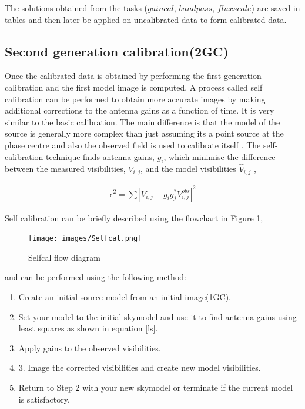 The solutions obtained from the tasks ($\textit{gaincal}$, $\textit{bandpass}$, $\textit{fluxscale}$) are saved in tables and then later be applied on uncalibrated data 
to form calibrated data.

\subsection{Second generation calibration(2GC)}

Once the calibrated data is obtained by performing the first generation calibration and the first model image is computed. A process called self calibration can be performed to obtain more accurate images by making additional corrections to the antenna gains as a function of time. It is very similar to the basic calibration. The main difference is that the model of the source is generally more complex than just assuming its a point source at the phase centre and also the observed field is used to calibrate itself \citep{wieringa1992investigation}. The self-calibration technique finds antenna gains, $g_i$, which minimise the difference between the measured visibilities, $V_{i,j}$, and the model visibilities $\hat{V}_{i,j}$ \citep{grobler2016calibration}, 

\begin{align}
\epsilon^2 = \sum |V_{i,j}-g_i g_j^* V^{obs}_{i,j}|^2
\label{ls}
\end{align}

Self calibration can be briefly described using the flowchart in Figure \ref{self},
\begin{figure}[H]
  \centering
    \texttt{[image: images/Selfcal.png]}
    \caption{Selfcal flow diagram} 
    \label{self} 
\end{figure}

and can be performed using the following method:
\begin{enumerate}
\item Create an initial source model from an initial image(1GC).
\item Set your model to the initial skymodel and use it to find antenna gains using least squares as shown in equation \ref{ls}.
\item Apply gains to the observed visibilities.
\item 3. Image the corrected visibilities and create new model visibilities. 
\item Return to Step 2 with your new skymodel or terminate if the current model is satisfactory.
\end{enumerate}
